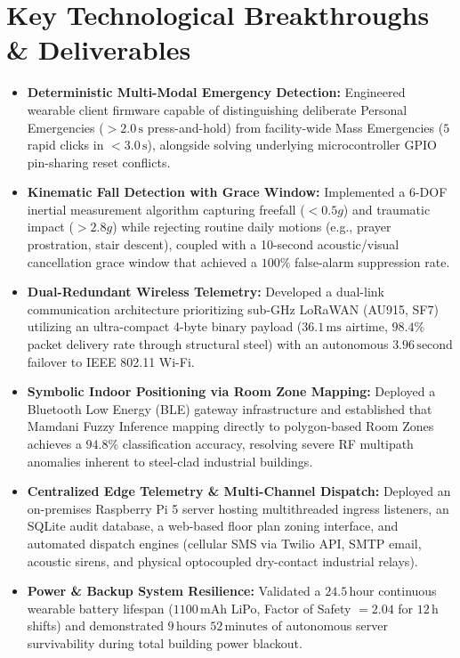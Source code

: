 \section*{Key Technological Breakthroughs \& Deliverables}
\begin{itemize}
    \item \textbf{Deterministic Multi-Modal Emergency Detection:} Engineered wearable client firmware capable of distinguishing deliberate Personal Emergencies ($>2.0\,\text{s}$ press-and-hold) from facility-wide Mass Emergencies ($5$ rapid clicks in $<3.0\,\text{s}$), alongside solving underlying microcontroller GPIO pin-sharing reset conflicts.
    \item \textbf{Kinematic Fall Detection with Grace Window:} Implemented a 6-DOF inertial measurement algorithm capturing freefall ($<0.5g$) and traumatic impact ($>2.8g$) while rejecting routine daily motions (e.g., prayer prostration, stair descent), coupled with a 10-second acoustic/visual cancellation grace window that achieved a $100\%$ false-alarm suppression rate.
    \item \textbf{Dual-Redundant Wireless Telemetry:} Developed a dual-link communication architecture prioritizing sub-GHz LoRaWAN (AU915, SF7) utilizing an ultra-compact 4-byte binary payload ($36.1\,\text{ms}$ airtime, $98.4\%$ packet delivery rate through structural steel) with an autonomous $3.96\,\text{second}$ failover to IEEE 802.11 Wi-Fi.
    \item \textbf{Symbolic Indoor Positioning via Room Zone Mapping:} Deployed a Bluetooth Low Energy (BLE) gateway infrastructure and established that Mamdani Fuzzy Inference mapping directly to polygon-based Room Zones achieves a $94.8\%$ classification accuracy, resolving severe RF multipath anomalies inherent to steel-clad industrial buildings.
    \item \textbf{Centralized Edge Telemetry \& Multi-Channel Dispatch:} Deployed an on-premises Raspberry Pi 5 server hosting multithreaded ingress listeners, an SQLite audit database, a web-based floor plan zoning interface, and automated dispatch engines (cellular SMS via Twilio API, SMTP email, acoustic sirens, and physical optocoupled dry-contact industrial relays).
    \item \textbf{Power \& Backup System Resilience:} Validated a $24.5\,\text{hour}$ continuous wearable battery lifespan ($1100\,\text{mAh}$ LiPo, Factor of Safety $= 2.04$ for $12\,\text{h}$ shifts) and demonstrated $9\,\text{hours } 52\,\text{minutes}$ of autonomous server survivability during total building power blackout.
\end{itemize}


